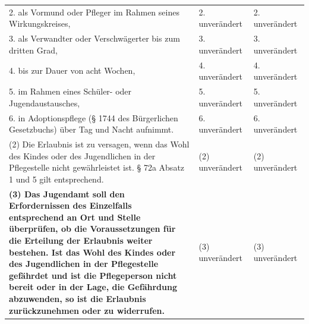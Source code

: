 \documentclass[10pt,a4paper,landscape]{article}
\begin{document}
\begin{longtable}{|L{8.2cm}|L{8.2cm}|L{8.2cm}|}
\hhline{|---|}
2.  \newline als Vormund oder Pfleger im Rahmen  \newline seines Wirkungskreises, & 2. unverändert & 2. unverändert \\
\hhline{|---|}
3.  \newline als Verwandter oder Verschwägerter bis  \newline zum dritten Grad, & 3. unverändert & 3. unverändert \\
\hhline{|---|}
4.  \newline bis zur Dauer von acht Wochen, & 4. unverändert & 4. unverändert \\
\hhline{|---|}
5.  \newline im Rahmen eines Schüler- oder  \newline Jugendaustausches, & 5. unverändert & 5. unverändert \\
\hhline{|---|}
6.  \newline in Adoptionspflege (\S{} 1744 des  \newline Bürgerlichen Gesetzbuchs)  \newline über Tag und Nacht aufnimmt. & 6. unverändert & 6. unverändert \\
\hhline{|---|}
(2) Die Erlaubnis ist zu versagen, wenn das  \newline Wohl des Kindes oder des Jugendlichen in  \newline der Pflegestelle nicht gewährleistet ist. \S{}  \newline 72a Absatz 1 und 5 gilt entsprechend. & (2) unverändert & (2) unverändert \\
\hhline{|---|}
\textbf{(3) Das Jugendamt soll den  \newline Erfordernissen des Einzelfalls  \newline entsprechend an Ort und Stelle  \newline überprüfen, ob die Voraussetzungen für  \newline die Erteilung der Erlaubnis weiter  \newline bestehen. Ist das Wohl des Kindes oder  \newline des Jugendlichen in der Pflegestelle  \newline gefährdet und ist die Pflegeperson nicht  \newline bereit oder in der Lage, die Gefährdung  \newline abzuwenden, so ist die Erlaubnis  \newline zurückzunehmen oder zu widerrufen. } & (3) unverändert & (3) unverändert \\

\end{longtable}
\end{document}
